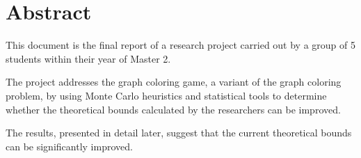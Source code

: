 \section*{Abstract}
This document is the final report of a research project carried out by a group of 5 students within their year of Master 2.

The project addresses the graph coloring game, a variant of the graph coloring problem, by using Monte Carlo heuristics and statistical tools to determine whether the theoretical bounds calculated by the researchers can be improved.

The results, presented in detail later, suggest that the current theoretical bounds can be significantly improved.